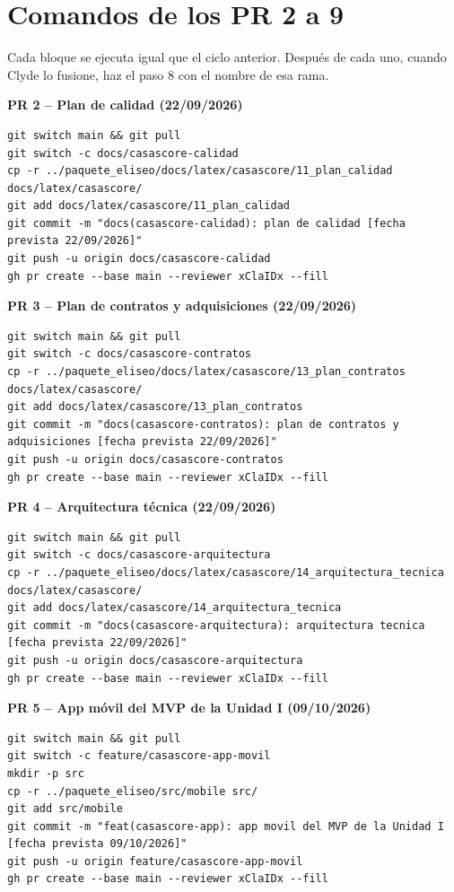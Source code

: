 \documentclass[11pt,a4paper]{article}
\begin{document}
\section{Comandos de los PR 2 a 9}
Cada bloque se ejecuta igual que el ciclo anterior. Después de cada uno, cuando Clyde lo fusione, haz el paso 8 con el nombre de esa rama.

\noindent\textbf{PR 2 -- Plan de calidad (22/09/2026)}
\begin{lstlisting}
git switch main && git pull
git switch -c docs/casascore-calidad
cp -r ../paquete_eliseo/docs/latex/casascore/11_plan_calidad docs/latex/casascore/
git add docs/latex/casascore/11_plan_calidad
git commit -m "docs(casascore-calidad): plan de calidad [fecha prevista 22/09/2026]"
git push -u origin docs/casascore-calidad
gh pr create --base main --reviewer xClaIDx --fill
\end{lstlisting}

\noindent\textbf{PR 3 -- Plan de contratos y adquisiciones (22/09/2026)}
\begin{lstlisting}
git switch main && git pull
git switch -c docs/casascore-contratos
cp -r ../paquete_eliseo/docs/latex/casascore/13_plan_contratos docs/latex/casascore/
git add docs/latex/casascore/13_plan_contratos
git commit -m "docs(casascore-contratos): plan de contratos y adquisiciones [fecha prevista 22/09/2026]"
git push -u origin docs/casascore-contratos
gh pr create --base main --reviewer xClaIDx --fill
\end{lstlisting}

\noindent\textbf{PR 4 -- Arquitectura técnica (22/09/2026)}
\begin{lstlisting}
git switch main && git pull
git switch -c docs/casascore-arquitectura
cp -r ../paquete_eliseo/docs/latex/casascore/14_arquitectura_tecnica docs/latex/casascore/
git add docs/latex/casascore/14_arquitectura_tecnica
git commit -m "docs(casascore-arquitectura): arquitectura tecnica [fecha prevista 22/09/2026]"
git push -u origin docs/casascore-arquitectura
gh pr create --base main --reviewer xClaIDx --fill
\end{lstlisting}

\noindent\textbf{PR 5 -- App móvil del MVP de la Unidad I (09/10/2026)}
\begin{lstlisting}
git switch main && git pull
git switch -c feature/casascore-app-movil
mkdir -p src
cp -r ../paquete_eliseo/src/mobile src/
git add src/mobile
git commit -m "feat(casascore-app): app movil del MVP de la Unidad I [fecha prevista 09/10/2026]"
git push -u origin feature/casascore-app-movil
gh pr create --base main --reviewer xClaIDx --fill
\end{lstlisting}
\end{document}
